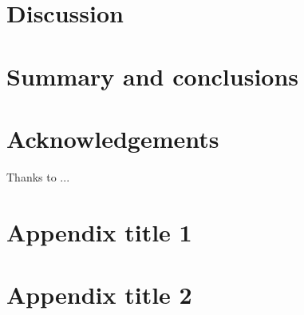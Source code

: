 \documentclass[final,5p,times,twocolumn,authoryear]{elsarticle}
\begin{document}
\section{Discussion}
\lipsum[4]

\section{Summary and conclusions}
\lipsum[1-4]


\section*{Acknowledgements}
Thanks to ...

\appendix

\section{Appendix title 1}

\section{Appendix title 2}

 







\end{document}
